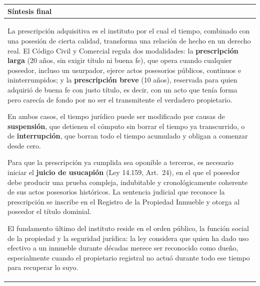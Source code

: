 \documentclass[12pt,oneside]{book}
\begin{document}
\begin{longtable}{@{}>{\raggedright\arraybackslash}p{}@{}}
\toprule
\textbf{Síntesis final} \\
\midrule
La prescripción adquisitiva es el instituto por el cual el tiempo, combinado con una posesión de cierta calidad, transforma una relación de hecho en un derecho real. El Código Civil y Comercial regula dos modalidades: la \textbf{prescripción larga} (20 años, sin exigir título ni buena fe), que opera cuando cualquier poseedor, incluso un usurpador, ejerce actos posesorios públicos, continuos e ininterrumpidos; y la \textbf{prescripción breve} (10 años), reservada para quien adquirió de buena fe con justo título, es decir, con un acto que tenía forma pero carecía de fondo por no ser el transmitente el verdadero propietario.

En ambos casos, el tiempo jurídico puede ser modificado por causas de \textbf{suspensión}, que detienen el cómputo sin borrar el tiempo ya transcurrido, o de \textbf{interrupción}, que borran todo el tiempo acumulado y obligan a comenzar desde cero.

Para que la prescripción ya cumplida sea oponible a terceros, es necesario iniciar el \textbf{juicio de usucapión} (Ley 14.159, Art.~24), en el que el poseedor debe producir una prueba compleja, indubitable y cronológicamente coherente de sus actos posesorios históricos. La sentencia judicial que reconoce la prescripción se inscribe en el Registro de la Propiedad Inmueble y otorga al poseedor el título dominial.

El fundamento último del instituto reside en el orden público, la función social de la propiedad y la seguridad jurídica: la ley considera que quien ha dado uso efectivo a un inmueble durante décadas merece ser reconocido como dueño, especialmente cuando el propietario registral no actuó durante todo ese tiempo para recuperar lo suyo. \\
\bottomrule
\end{longtable}
\end{document}
